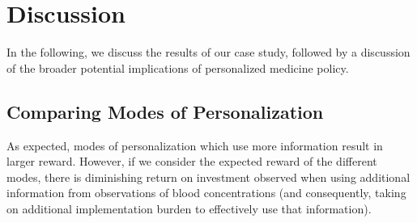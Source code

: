 \section{Discussion}\label{ss:discussion}


In the following, we discuss the results of our case study, followed by a discussion of the broader potential implications of personalized medicine policy.

\subsection{Comparing Modes of Personalization}

As expected, modes of personalization which use more information result in larger reward. However, if we consider the expected reward of the different modes, there is diminishing return on investment observed when using additional information from observations of blood concentrations (and consequently, taking on additional implementation burden to effectively use that information). 



